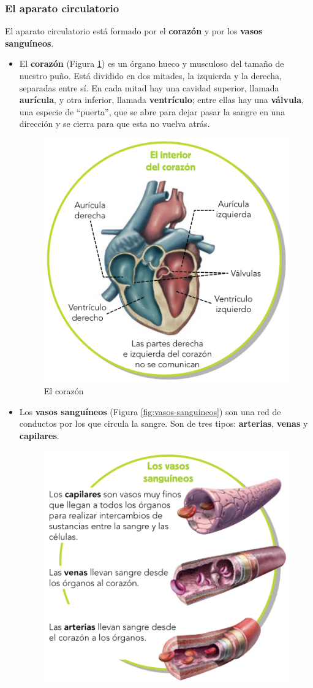 \subsubsection{El aparato circulatorio}

El aparato circulatorio está formado por el \textbf{corazón} y por los \textbf{vasos sanguíneos}.

\begin{itemize}
    \item El \textbf{corazón} (Figura \ref{fig:corazon}) es un órgano hueco y musculoso del tamaño de nuestro puño. Está dividido en dos mitades, la izquierda y la derecha, separadas entre sí. En cada mitad hay una cavidad superior, llamada \textbf{aurícula}, y otra inferior, llamada \textbf{ventrículo}; entre ellas hay una \textbf{válvula}, una especie de ``puerta'', que se abre para dejar pasar la sangre en una dirección y se cierra para que esta no vuelva atrás.
    \begin{figure}[!ht]
        \centering
        \includegraphics[width=0.6\linewidth]{Tema3/06_Corazon.png}
        \caption{El corazón}
        \label{fig:corazon}
    \end{figure}
    \item Los \textbf{vasos sanguíneos} (Figura \ref{fig:vasos-sanguineos}) son una red de conductos por los que circula la sangre. Son de tres tipos: \textbf{arterias}, \textbf{venas} y \textbf{capilares}.
    \begin{figure}[!ht]
        \centering
        \includegraphics[width=0.7\linewidth]{Tema3/07_Vasos_sanguineos.png}

\end{figure}
\end{itemize}
